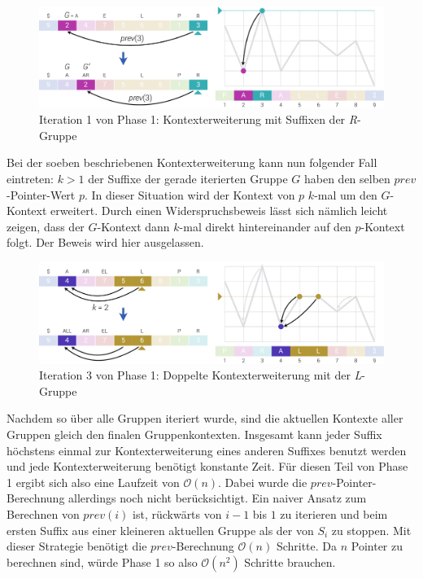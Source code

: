 \documentclass[twoside,a4paper,11pt]{article}
\theoremstyle{break}
\begin{document}
\begin{figure}[h]
	\centering
	\includegraphics[width=\linewidth,bb=0 0 1310 386]{./assets/phase1-R.pdf}
	\caption{Iteration 1 von Phase 1: Kontexterweiterung mit Suffixen der \textit{R}-Gruppe}
\label{fig:phase1-R}
\end{figure}

Bei der soeben beschriebenen Kontexterweiterung kann nun folgender Fall eintreten: $k > 1$ der Suffixe der gerade iterierten Gruppe $G$ haben den selben $prev$-Pointer-Wert $p$. In dieser Situation wird der Kontext von $p$ $k$-mal um den $G$-Kontext erweitert. Durch einen Widerspruchsbeweis lässt sich nämlich leicht zeigen, dass der $G$-Kontext dann $k$-mal direkt hintereinander auf den $p$-Kontext folgt. Der Beweis wird hier ausgelassen.

\begin{figure}[h]
	\centering
	\includegraphics[width=\linewidth,bb=0 0 1310 386]{./assets/phase1-L.pdf}
	\caption{Iteration 3 von Phase 1: Doppelte Kontexterweiterung mit der \textit{L}-Gruppe}
\label{fig:phase1-L}
\end{figure}

Nachdem so über alle Gruppen iteriert wurde, sind die aktuellen Kontexte aller Gruppen gleich den finalen Gruppenkontexten. Insgesamt kann jeder Suffix höchstens einmal zur Kontexterweiterung eines anderen Suffixes benutzt werden und jede Kontexterweiterung benötigt konstante Zeit. Für diesen Teil von Phase 1 ergibt sich also eine Laufzeit von $\mathcal{O}(n)$. Dabei wurde die $prev$-Pointer-Berechnung allerdings noch nicht berücksichtigt. Ein naiver Ansatz zum Berechnen von $prev(i)$ ist, rückwärts von $i - 1$ bis $1$ zu iterieren und beim ersten Suffix aus einer kleineren aktuellen Gruppe als der von $S_i$ zu stoppen. Mit dieser Strategie benötigt die $prev$-Berechnung $\mathcal{O}(n)$ Schritte. Da $n$ Pointer zu berechnen sind, würde Phase 1 so also $\mathcal{O}(n^2)$ Schritte brauchen.\\
\end{document}
